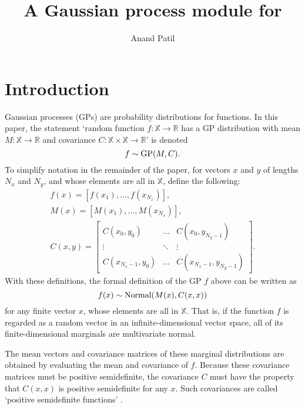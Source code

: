 \documentclass[article]{jss}
\author{Anand Patil}
\title{A Gaussian process module for \pkg{PyMC}}
\begin{document}
\maketitle

\tableofcontents


\section{Introduction}\label{sec:firstlook}

Gaussian processes (GPs) are probability distributions for functions. In this paper, the statement `random function $f:\mathbb X\rightarrow \mathbb R$ has a GP distribution with mean $M:\mathbb X\rightarrow \mathbb R$ and covariance $C:\mathbb X\times \mathbb X\rightarrow \mathbb R$' is denoted
\begin{equation}
    f\sim\textup{GP}(M,C).
\end{equation}
To simplify notation in the remainder of the paper, for vectors $x$ and $y$ of lengths $N_x$ and $N_y$, and whose elements are all in $\mathbb X$, define the following:
\begin{eqnarray*}
    f(x) = \left[f(x_1),\ldots,f(x_{N_x})\right],\\
    M(x) = \left[M(x_1),\ldots,M(x_{N_x})\right],\\
    C(x,y) = \left[\begin{array}{ccc}
        C(x_0,y_0)& \ldots& C(x_0,y_{N_y-1})\\
        \vdots&\ddots&\vdots\\
        C(x_{N_x-1},y_0)& \ldots& C(x_{N_x-1},y_{N_y-1})
    \end{array}\right].
\end{eqnarray*}
With these definitions, the formal definition of the GP $f$ above \citep{banerjee} can be written as
\begin{equation}
    f(x)\sim\textup{Normal}(M(x),C(x,x))
\end{equation}
for any finite vector $x$, whose elements are all in $\mathbb X$. That is, if the function $f$ is regarded as a random vector in an infinite-dimensional vector space, all of its finite-dimensional marginals are multivariate normal. 

The mean vectors and covariance matrices of these marginal distributions are obtained by evaluating the mean and covariance of $f$. Because these covariance matrices must be positive semidefinite, the covariance $C$ must have the property that $C(x,x)$ is positive semidefinite for any $x$. Such covariances are called `positive semidefinite functions' \cite{someone}. 
\end{document}
